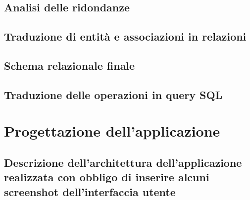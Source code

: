\documentclass[a4paper,12pt]{report}
\begin{document}
\section{Analisi delle ridondanze}
\section{Traduzione di entità e associazioni in relazioni}
\section{Schema relazionale finale}
\section{Traduzione delle operazioni in query SQL}
\chapter{Progettazione dell'applicazione}
\section{Descrizione dell'architettura dell'applicazione realizzata con obbligo di inserire alcuni screenshot dell'interfaccia utente}
\end{document}

